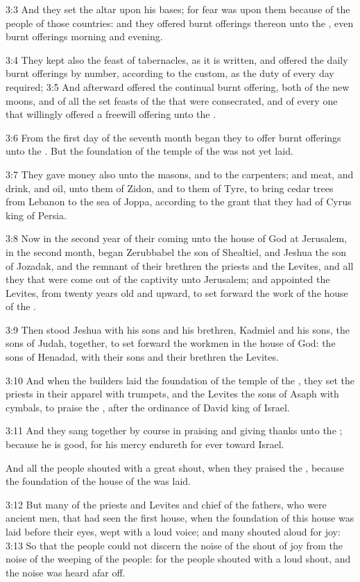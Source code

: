 3:3 And they set the altar upon his bases; for fear was upon them because of the people of those countries: and they offered burnt offerings thereon unto the \LORD, even burnt offerings morning and evening.

3:4 They kept also the feast of tabernacles, as it is written, and offered the daily burnt offerings by number, according to the custom, as the duty of every day required; 3:5 And afterward offered the continual burnt offering, both of the new moons, and of all the set feasts of the \LORD that were consecrated, and of every one that willingly offered a freewill offering unto the \LORD.

3:6 From the first day of the seventh month began they to offer burnt offerings unto the \LORD. But the foundation of the temple of the \LORD was not yet laid.

3:7 They gave money also unto the masons, and to the carpenters; and meat, and drink, and oil, unto them of Zidon, and to them of Tyre, to bring cedar trees from Lebanon to the sea of Joppa, according to the grant that they had of Cyrus king of Persia.

3:8 Now in the second year of their coming unto the house of God at Jerusalem, in the second month, began Zerubbabel the son of Shealtiel, and Jeshua the son of Jozadak, and the remnant of their brethren the priests and the Levites, and all they that were come out of the captivity unto Jerusalem; and appointed the Levites, from twenty years old and upward, to set forward the work of the house of the \LORD.

3:9 Then stood Jeshua with his sons and his brethren, Kadmiel and his sons, the sons of Judah, together, to set forward the workmen in the house of God: the sons of Henadad, with their sons and their brethren the Levites.

3:10 And when the builders laid the foundation of the temple of the \LORD, they set the priests in their apparel with trumpets, and the Levites the sons of Asaph with cymbals, to praise the \LORD, after the ordinance of David king of Israel.

3:11 And they sang together by course in praising and giving thanks unto the \LORD; because he is good, for his mercy endureth for ever toward Israel.

And all the people shouted with a great shout, when they praised the \LORD, because the foundation of the house of the \LORD was laid.

3:12 But many of the priests and Levites and chief of the fathers, who were ancient men, that had seen the first house, when the foundation of this house was laid before their eyes, wept with a loud voice; and many shouted aloud for joy: 3:13 So that the people could not discern the noise of the shout of joy from the noise of the weeping of the people: for the people shouted with a loud shout, and the noise was heard afar off.

